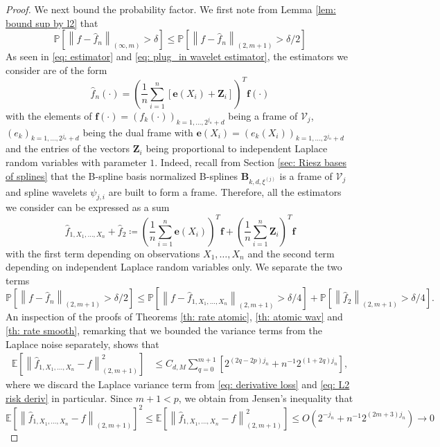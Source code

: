 \documentclass[preprint]{imsart}
\newcommand\norm[1]{\left\lVert#1\right\rVert}
\numberwithin{equation}{section}
\newcounter{cond}
\begin{document}
\begin{appendix}
\begin{proof}
We next bound the probability factor. We first note from Lemma \ref{lem: bound sup by l2} that
\[\mathbb{P}\left[\norm{f-\hat{f}_n}_{(\infty,m)}> \delta\right]\leq \mathbb{P}\left[\norm{f-\hat{f}_n}_{(2,m+1)}> \delta/2\right]\]
As seen in \eqref{eq: estimator} and \eqref{eq: plug_in wavelet estimator}, the estimators we consider are of the form
\[\hat{f}_n(\cdot) = \left(\frac{1}{n}\sum_{i=1}^n [\mathbf{e}(X_i)+\mathbf{Z}_i]\right)^T \mathbf{f}(\cdot)\]
with the elements of $\mathbf{f}(\cdot)=(f_k(\cdot))_{k=1,\dots,2^{j_n}+d}$ being a frame of $\mathcal{V}_j$, $(e_{k})_{k=1,\dots,2^{j_n}+d}$ being the dual frame with $\mathbf{e}(X_i)=(e_k(X_i))_{k=1,\dots,2^{j_n}+d}$ and the entries of the vectors $\mathbf{Z}_i$ being proportional to independent Laplace random variables with parameter $1$. Indeed, recall from Section \ref{sec: Riesz bases of splines} that the B-spline basis normalized B-splines $\mathbf{B}_{k,d,\xi^{(j)}}$ is a frame of $\mathcal{V}_j$ and spline wavelets $\psi_{j,i}$ are built to form a frame.
Therefore, all the estimators we consider can be expressed as a sum \[\hat{f}_{1,X_1,\dots,X_n}+\hat{f}_2\coloneqq \left(\frac{1}{n}\sum_{i=1}^n \mathbf{e}(X_i)\right)^T \mathbf{f} + \left(\frac{1}{n}\sum_{i=1}^n \mathbf{Z}_i\right)^T \mathbf{f}\] with the first term depending on observations $X_1,\dots,X_n$ and the second term depending on independent Laplace random variables only. We separate the two terms
\[\mathbb{P}\left[\norm{f-\hat{f}_n}_{(2,m+1)}> \delta/2\right] \leq \mathbb{P}\left[\norm{f-\hat{f}_{1,X_1,\dots,X_n}}_{(2,m+1)}> \delta/4\right]+\mathbb{P}\left[\norm{\hat{f}_2}_{(2,m+1)}> \delta/4\right].\]
An inspection of the proofs of Theorems \ref{th: rate atomic}, \ref{th: atomic wav} and \ref{th: rate smooth}, remarking that we bounded the variance terms from the Laplace noise separately, shows that
\begin{align*}
    \mathbb{E}\left[\norm{\hat{f}_{1,X_1,\dots,X_n}-f}_{(2,m+1)}^2\right]
    &\leq  C_{d,M} \sum_{q=0}^{m+1} \left[ 2^{(2q-2p)j_n}+ n^{-1}2^{(1+2q)j_n}\right],
\end{align*}
where we discard the Laplace variance term from \eqref{eq: derivative loss} and \eqref{eq: L2 risk deriv} in particular. Since $m+1<p$, we obtain from Jensen's inequality that
\[\mathbb{E}\left[\norm{\hat{f}_{1,X_1,\dots,X_n}-f}_{(2,m+1)}\right]^2\leq\mathbb{E}\left[\norm{\hat{f}_{1,X_1,\dots,X_n}-f}_{(2,m+1)}^2\right]\leq O\left(2^{-j_n}+ n^{-1}2^{(2m+3)j_n}\right)\to 0\]

\end{proof}
\end{appendix}
\end{document}
